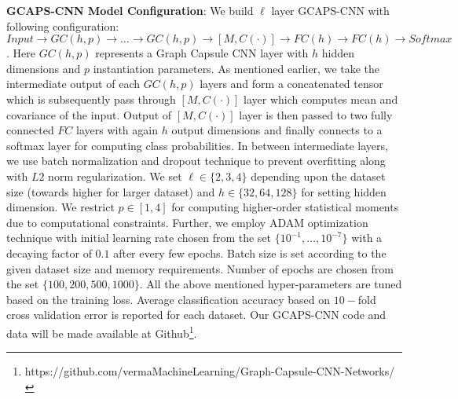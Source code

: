 \documentclass{article}
\begin{document}
\begin{table*}[t!]
	\caption{Classification  accuracy   on bioinformatics datasets. %
		Result in \textbf{bold} indicates the  best reported classification accuracy. Top half of the table compares results  with   various deep learning approaches while bottom half compares results with graph kernels. `$>1$ day' represents that the computation exceed more than $24hrs$. `OMR' is out of memory error.} %
		\label{table:bio_results}
	
\end{table*}








\noindent \textbf{GCAPS-CNN Model Configuration}: We build  $\ell$ layer GCAPS-CNN     with following configuration: $Input \rightarrow GC(h,p) \rightarrow \dots \rightarrow GC(h,p) \rightarrow [M,C(\cdot)]\rightarrow FC(h) \rightarrow FC(h) \rightarrow Softmax$. Here $GC(h,p)$ represents a Graph Capsule CNN layer with $h$ hidden dimensions and $p$ instantiation parameters. As mentioned earlier, we take the intermediate output of each $GC(h,p)$ layers and form a concatenated tensor    which is subsequently pass through $ [M,C(\cdot)]$ layer which computes mean and covariance of the input. Output of $ [M,C(\cdot)]$ layer   is then  passed to two fully connected $FC$ layers  with again $h$ output dimensions and finally connects to a  softmax layer for computing class probabilities. In between intermediate layers, we use batch normalization and  dropout  technique to prevent overfitting along with $L2$ norm regularization. We set $\ell\in \{2, 3, 4\}$ depending upon the dataset size (towards higher   for larger dataset) and $h\in \{32, 64, 128\}$ for setting hidden dimension. We restrict $p\in [1, 4]$ for computing higher-order statistical moments due to computational constraints. Further, we employ ADAM optimization technique with  initial learning rate chosen from the set $\{10^{-1},\dots, 10^{-7}\}$ with a   decaying factor of $0.1$ after every few   epochs. Batch size is set according to the given dataset size and memory requirements. Number of epochs are  chosen from the set $\{100, 200, 500, 1000\}$. All the above mentioned hyper-parameters are tuned based on the training loss. Average classification accuracy based on $10-$fold cross validation error is reported for each dataset.  Our GCAPS-CNN code and data will be made  available at Github\footnote{https://github.com/vermaMachineLearning/Graph-Capsule-CNN-Networks/}.
\end{document}
